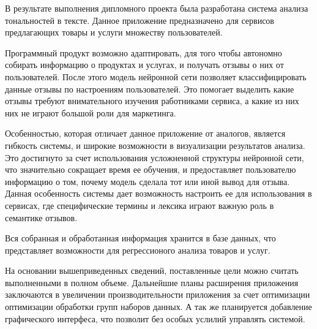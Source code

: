 \setcounter{page}{77}
\label{sec:outro}
В результате выполнения дипломного проекта была разработана система анализа тональностей в тексте. Данное приложение предназначено для сервисов предлагающих товары и услуги множеству пользователей.

Программный продукт возможно адаптировать, для того чтобы автономно собирать информацию о продуктах и услугах, и получать отзывы о них от пользователей. После этого модель нейронной сети позволяет классифицировать данные отзывы по настроениям пользователей. Это помогает выделить какие отзывы требуют внимательного изучения работниками сервиса, а какие из них них не играют большой роли для маркетинга.

Особенностью, которая отличает данное приложение от аналогов, является гибкость системы, и широкие возможности в визуализации результатов анализа. Это достигнуто за счет использования усложненной структуры нейронной сети, что значительно сокращает время ее обучения, и предоставляет пользователю информацию о том, почему модель сделала тот или иной вывод для отзыва. Данная особенность системы дает возможность настроить ее для использования в сервисах, где специфические термины и лексика играют важную роль в семантике отзывов.

Вся собранная и обработанная информация хранится в базе данных, что представляет возможности для регрессионого анализа товаров и услуг.

На основании вышеприведенных сведений, поставленные цели можно считать выполненными в полном объеме. Дальнейшие планы расширения приложения заключаются в увеличении производительности приложения за счет оптимизации оптимизации обработки групп наборов данных. А так же планируется добавление графического интерфеса, что позволит без особых услилий управлять системой.